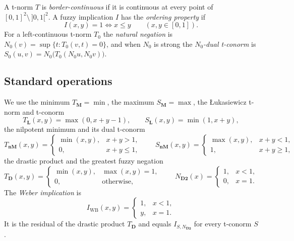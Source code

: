 \documentclass[11pt]{amsart}
\numberwithin{equation}{section}
\theoremstyle{definition}
\theoremstyle{remark}
\newcommand{\IWB}{I_{\mathrm{WB}}}
\newcommand{\TL}{T_{\mathbf{L}}}
\newcommand{\SL}{S_{\mathbf{L}}}
\newcommand{\TnM}{T_{\mathbf{nM}}}
\newcommand{\SnM}{S_{\mathbf{nM}}}
\newcommand{\TD}{T_{\mathbf{D}}}
\newcommand{\TM}{T_{\mathbf{M}}}
\newcommand{\SM}{S_{\mathbf{M}}}
\newcommand{\ND}{N_{\mathbf{D2}}}
\newcommand{\open}{\,]0,1[}
\begin{document}
A t-norm $T$ is \emph{border-continuous} if it is continuous at every point of
$[0,1]^2\setminus\open^2$. A fuzzy implication $I$ has the \emph{ordering
property} if
\begin{equation}\label{eq:op}
  I(x,y)=1 \iff x\le y \qquad (x,y\in[0,1]).
\end{equation}
For a left-continuous t-norm $T_0$ the \emph{natural negation} is
$N_0(v)=\sup\{t : T_0(v,t)=0\}$, and when $N_0$ is strong the
\emph{$N_0$-dual t-conorm} is $S_0(u,v)=N_0\bigl(T_0(N_0u,N_0v)\bigr)$.

\subsection*{Standard operations}
We use the minimum $\TM=\min$, the maximum $\SM=\max$, the
{\L}ukasiewicz t-norm and t-conorm
\begin{equation}\label{eq:luk}
  \TL(x,y)=\max(0,x+y-1),\qquad \SL(x,y)=\min(1,x+y),
\end{equation}
the nilpotent minimum and its dual t-conorm
\begin{equation}\label{eq:nm}
  \TnM(x,y)=\begin{cases} \min(x,y), & x+y>1,\\ 0, & x+y\le 1,\end{cases}
  \qquad
  \SnM(x,y)=\begin{cases} \max(x,y), & x+y<1,\\ 1, & x+y\ge 1,\end{cases}
\end{equation}
the drastic product and the greatest fuzzy negation
\begin{equation}\label{eq:drastic}
  \TD(x,y)=\begin{cases} \min(x,y), & \max(x,y)=1,\\ 0, & \text{otherwise},\end{cases}
  \qquad
  \ND(x)=\begin{cases} 1, & x<1,\\ 0, & x=1.\end{cases}
\end{equation}
The \emph{Weber implication} is
\begin{equation}\label{eq:weber}
  \IWB(x,y)=\begin{cases} 1, & x<1,\\ y, & x=1.\end{cases}
\end{equation}
It is the residual of the drastic product $\TD$ and equals $I_{S,\ND}$ for
every t-conorm $S$.
\end{document}
